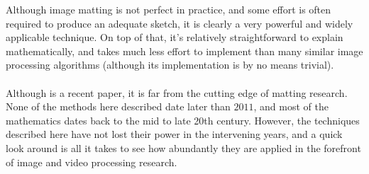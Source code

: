 Although image matting is not perfect in practice, and some effort is often required to produce an adequate sketch, it is clearly a very powerful and widely applicable technique. On top of that, it's relatively straightforward to explain mathematically, and takes much less effort to implement than many similar image processing algorithms (although its implementation is by no means trivial).
\\\\
Although \cite{lee14} is a recent paper, it is far from the cutting edge of matting research. None of the methods here described date later than $2011$, and most of the mathematics dates back to the mid to late 20th century. However, the techniques described here have not lost their power in the intervening years, and a quick look around is all it takes to see how abundantly they are applied in the forefront of image and video processing research.